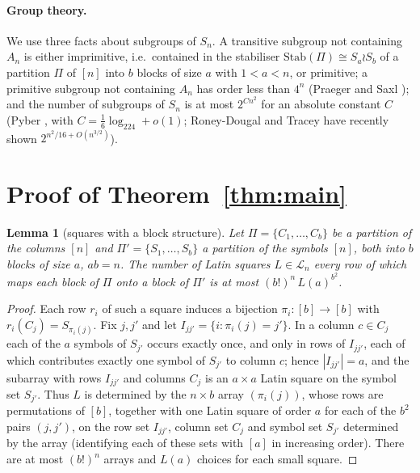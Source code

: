 \documentclass[11pt]{amsart}
\theoremstyle{plain}
\newtheorem{lemma}[theorem]{Lemma}
\theoremstyle{remark}
\newcommand{\Stab}{\mathrm{Stab}}
\newcommand{\LL}{\mathcal{L}}
\begin{document}
\paragraph{Group theory.}  We use three facts about subgroups of $S_n$.
A transitive subgroup not containing $A_n$ is either imprimitive, i.e.\
contained in the stabiliser $\Stab(\Pi)\cong S_a\wr S_b$ of a partition
$\Pi$ of $[n]$ into $b$ blocks of size $a$ with $1<a<n$, or primitive;
a primitive subgroup not containing $A_n$ has order less than $4^n$
(Praeger and Saxl \cite{PS80}); and the number of subgroups of $S_n$ is
at most $2^{Cn^2}$ for an absolute constant $C$ (Pyber \cite{Pyb93},
with $C=\frac16\log_224+o(1)$; Roney-Dougal and Tracey \cite{RT25} have
recently shown $2^{n^2/16+O(n^{3/2})}$).

\section{Proof of Theorem~\ref{thm:main}}

\begin{lemma}[squares with a block structure]\label{lem:block}
Let $\Pi=\{C_1,\dots,C_b\}$ be a partition of the columns $[n]$ and
$\Pi'=\{S_1,\dots,S_b\}$ a partition of the symbols $[n]$, both into $b$
blocks of size $a$, $ab=n$.  The number of Latin squares $L\in\LL_n$
every row of which maps each block of $\Pi$ onto a block of $\Pi'$ is at
most $(b!)^n\,L(a)^{b^2}$.
\end{lemma}

\begin{proof}
Each row $r_i$ of such a square induces a bijection $\pi_i\colon[b]\to[b]$
with $r_i(C_j)=S_{\pi_i(j)}$.  Fix $j,j'$ and let
$I_{jj'}=\{i:\pi_i(j)=j'\}$.  In a column $c\in C_j$ each of the $a$
symbols of $S_{j'}$ occurs exactly once, and only in rows of $I_{jj'}$,
each of which contributes exactly one symbol of $S_{j'}$ to column $c$;
hence $|I_{jj'}|=a$, and the subarray with rows $I_{jj'}$ and columns
$C_j$ is an $a\times a$ Latin square on the symbol set $S_{j'}$.  Thus
$L$ is determined by the $n\times b$ array $(\pi_i(j))$, whose rows are
permutations of $[b]$, together with one Latin square of order $a$ for
each of the $b^2$ pairs $(j,j')$, on the row set $I_{jj'}$, column set
$C_j$ and symbol set $S_{j'}$ determined by the array (identifying
each of these sets with $[a]$ in increasing order).  There are at most
$(b!)^n$ arrays and $L(a)$ choices for each small square.
\end{proof}
\end{document}
